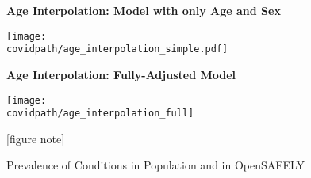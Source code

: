 \documentclass[12pt,letterpaper]{article}
\numberwithin{equation}{section}
\begin{document}
  \clearpage
  \begin{figure}[H]
    \begin{center}
    \caption{Prevalence of Conditions in Population and in OpenSAFELY}
    \textbf{Age Interpolation: Model with only Age and Sex}
    
    \texttt{[image: \\covidpath/age\_interpolation\_simple.pdf]}

    \newline
    \textbf{Age Interpolation: Fully-Adjusted Model}
    
    \texttt{[image: \\covidpath/age\_interpolation\_full]}
    
    \footnotesize{[figure note]}
    \end{center}
  \end{figure}
\end{document}
